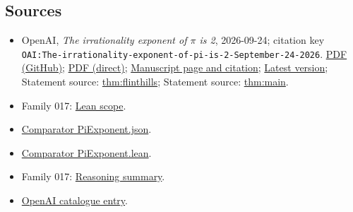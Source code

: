 \documentclass[11pt]{article}
\begin{document}
\subsection{Sources}
\begin{itemize}
\item OpenAI, \emph{The irrationality exponent of \(\pi\) is 2}, 2026-09-24; citation key \texttt{OAI:The-irrationality-exponent-of-pi-is-2-September-24-2026}. \href{https://github.com/openai/math/blob/adc7f1241b42e322a6451854ab7e4b4c146bf78a/preprints/The-irrationality-exponent-of-pi-is-2-September-24-2026/paper.pdf}{PDF (GitHub)}; \href{https://github.com/openai/math/raw/adc7f1241b42e322a6451854ab7e4b4c146bf78a/preprints/The-irrationality-exponent-of-pi-is-2-September-24-2026/paper.pdf}{PDF (direct)}; \href{https://github.com/openai/math/blob/adc7f1241b42e322a6451854ab7e4b4c146bf78a/preprints/The-irrationality-exponent-of-pi-is-2-September-24-2026/README.md}{Manuscript page and citation}; \href{https://github.com/openai/math/blob/main/preprints/The-irrationality-exponent-of-pi-is-2-September-24-2026/paper.pdf}{Latest version}; Statement source: \href{https://github.com/openai/math/blob/adc7f1241b42e322a6451854ab7e4b4c146bf78a/preprints/The-irrationality-exponent-of-pi-is-2-September-24-2026/build/main.tex\#L90}{thm:flinthills}; Statement source: \href{https://github.com/openai/math/blob/adc7f1241b42e322a6451854ab7e4b4c146bf78a/preprints/The-irrationality-exponent-of-pi-is-2-September-24-2026/build/main.tex\#L64}{thm:main}.
\item Family 017: \href{https://github.com/openai/math/blob/adc7f1241b42e322a6451854ab7e4b4c146bf78a/lean/docs/017.md}{Lean scope}.
\item \href{https://github.com/openai/math/blob/adc7f1241b42e322a6451854ab7e4b4c146bf78a/lean/ComparatorChallenges/PiExponent.json}{Comparator PiExponent.json}.
\item \href{https://github.com/openai/math/blob/adc7f1241b42e322a6451854ab7e4b4c146bf78a/lean/ComparatorChallenges/PiExponent.lean}{Comparator PiExponent.lean}.
\item Family 017: \href{https://github.com/openai/math/blob/adc7f1241b42e322a6451854ab7e4b4c146bf78a/reasoning\_traces/irrationality-exponent-of-pi.pdf}{Reasoning summary}.
\item \href{https://github.com/openai/math/blob/adc7f1241b42e322a6451854ab7e4b4c146bf78a/CONTENTS.md}{OpenAI catalogue entry}.
\end{itemize}
\end{document}
